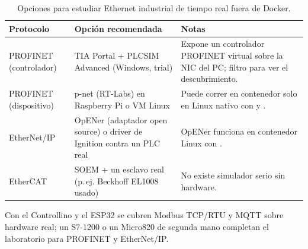 \begin{table}[H]
\centering\small
\caption{Opciones para estudiar Ethernet industrial de tiempo real fuera de Docker.}
\label{tab:rt}
\begin{tabularx}{\textwidth}{L{2.6cm} L{4.6cm} X}
\toprule
\textbf{Protocolo} & \textbf{Opción recomendada} & \textbf{Notas} \\
\midrule
PROFINET (controlador) & TIA Portal + PLCSIM Advanced (Windows, trial) & Expone un controlador PROFINET virtual sobre la NIC del PC; filtro  para ver el descubrimiento. \\
PROFINET (dispositivo) & p-net (RT-Labs) en Raspberry Pi o VM Linux & Puede correr en contenedor solo en Linux nativo con  y . \\
EtherNet/IP & OpENer (adaptador open source) o driver de Ignition contra un PLC real & OpENer funciona en contenedor Linux con . \\
EtherCAT & SOEM + un esclavo real (p.\,ej. Beckhoff EL1008 usado) & No existe simulador serio sin hardware. \\
\bottomrule
\end{tabularx}
\end{table}

Con el Controllino y el ESP32 se cubren Modbus TCP/RTU y MQTT sobre hardware real; un S7-1200 o un Micro820 de segunda mano completan el laboratorio para PROFINET y EtherNet/IP.
